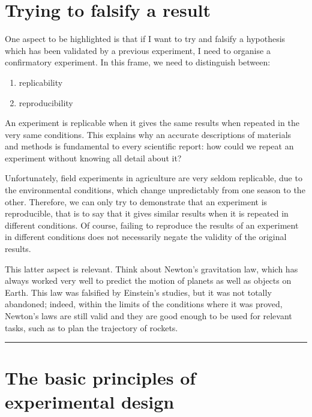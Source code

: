 \documentclass[a4paper,12pt,oneside]{book}
\providecommand{\tightlist}{%
  \setlength{\itemsep}{0pt}\setlength{\parskip}{0pt}}
\begin{document}
\hypertarget{trying-to-falsify-a-result}{%
\section{Trying to falsify a result}\label{trying-to-falsify-a-result}}

One aspect to be highlighted is that if I want to try and falsify a hypothesis which has been validated by a previous experiment, I need to organise a confirmatory experiment. In this frame, we need to distinguish between:

\begin{enumerate}
\def\labelenumi{\arabic{enumi}.}
\tightlist
\item
  replicability
\item
  reproducibility
\end{enumerate}

An experiment is replicable when it gives the same results when repeated in the very same conditions. This explains why an accurate descriptions of materials and methods is fundamental to every scientific report: how could we repeat an experiment without knowing all detail about it?

Unfortunately, field experiments in agriculture are very seldom replicable, due to the environmental conditions, which change unpredictably from one season to the other. Therefore, we can only try to demonstrate that an experiment is reproducible, that is to say that it gives similar results when it is repeated in different conditions. Of course, failing to reproduce the results of an experiment in different conditions does not necessarily negate the validity of the original results.

This latter aspect is relevant. Think about Newton's gravitation law, which has always worked very well to predict the motion of planets as well as objects on Earth. This law was falsified by Einstein's studies, but it was not totally abandoned; indeed, within the limits of the conditions where it was proved, Newton's laws are still valid and they are good enough to be used for relevant tasks, such as to plan the trajectory of rockets.

\begin{center}\rule{0.5\linewidth}{0.5pt}\end{center}

\hypertarget{the-basic-principles-of-experimental-design}{%
\section{The basic principles of experimental design}\label{the-basic-principles-of-experimental-design}}
\end{document}
